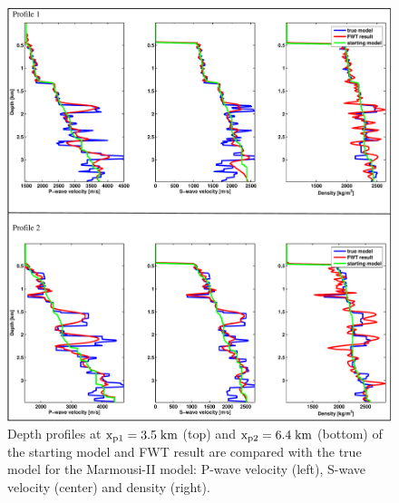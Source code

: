 \begin{figure}
\centering
\includegraphics[width=16cm]{figures/marmousi/marmousi_II_result_profile_1.pdf}
\caption{Depth profiles at $\rm{x_{p1}=3.5\;km}$ (top) and $\rm{x_{p2}=6.4\;km}$ (bottom) of the starting model and FWT result are compared with the true model for the Marmousi-II model: P-wave velocity (left), S-wave velocity (center) and density (right).}
\label{marmousi_II_result_profile}
\end{figure}
\clearpage
